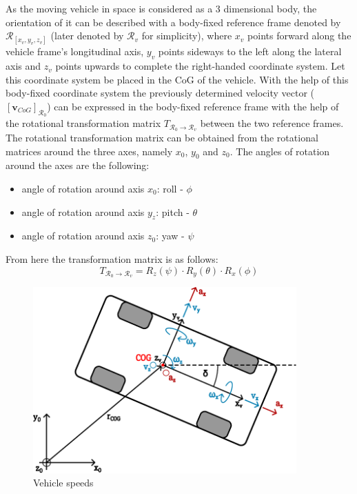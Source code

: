 As the moving vehicle in space is considered as a 3 dimensional body, the orientation of it can be described with a body-fixed reference frame denoted by $\mathcal{R}_{[x_v, y_v, z_v]}$ (later denoted by $\mathcal{R}_v$ for simplicity), where $x_v$ points forward along the vehicle frame's longitudinal axis, $y_v$ points sideways to the left along the lateral axis and $z_v$ points upwards to complete the right-handed coordinate system. Let this coordinate system be placed in the CoG of the vehicle. With the help of this body-fixed coordinate system the previously determined velocity vector ($[\textbf{v}_{CoG}]_{\mathcal{R}_0}$) can be expressed in the body-fixed reference frame with the help of the rotational transformation matrix $T_{\mathcal{R}_0 \rightarrow{} \mathcal{R}_v}$ between the two reference frames. The rotational transformation matrix can be obtained from the rotational matrices around the three axes, namely $x_0$, $y_0$ and $z_0$.
The angles of rotation around the axes are the following:
\begin{itemize}
    \item angle of rotation around axis $x_0$: roll - $\phi$
    \item angle of rotation around axis $y_z$: pitch - $\theta$
    \item angle of rotation around axis $z_0$: yaw - $\psi$
\end{itemize}
From here the transformation matrix is as follows:
\begin{equation}
    T_{\mathcal{R}_0 \rightarrow{} \mathcal{R}_v} = R_z(\psi) \cdot R_y(\theta) \cdot R_x(\phi) 
\end{equation}

\FloatBarrier
\begin{figure}[h]
    \centering
    \includegraphics[width=0.9\textwidth]{images/vehicle_speed.pdf}
    \caption{Vehicle speeds}
    \label{fig:geom_veh_speed}
\end{figure}
\FloatBarrier

